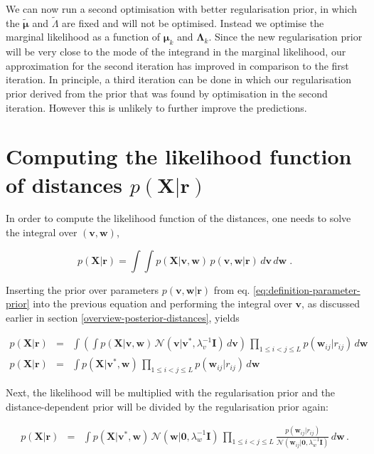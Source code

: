\documentclass[12pt,a4paper,twoside]{book}
\newcommand{\Gauss}{\mathcal{N}}
\newcommand{\I}{\mathbf{I}}
\newcommand{\Lk}{\mathbf{\Lambda}_k}
\newcommand{\muk}{\mathbf{\mu}_k}
\renewcommand{\r}{\mathbf{r}}
\newcommand{\rij}{r_{ij}}
\renewcommand{\v}{\mathbf{v}}
\newcommand{\w}{\mathbf{w}}
\newcommand{\wij}{\mathbf{w}_{ij}}
\newcommand{\X}{\mathbf{X}}
\theoremstyle{definition}
\theoremstyle{definition}
\theoremstyle{remark}
\begin{document}
We can now run a second optimisation with better regularisation prior,
in which the \(\tilde{\mathbf{\mu}}\) and \(\tilde{\Lambda}\) are fixed
and will not be optimised. Instead we optimise the marginal likelihood
as a function of \(\muk\) and \(\Lk\). Since the new regularisation
prior will be very close to the mode of the integrand in the marginal
likelihood, our approximation for the second iteration has improved in
comparison to the first iteration. In principle, a third iteration can
be done in which our regularisation prior derived from the prior that
was found by optimisation in the second iteration. However this is
unlikely to further improve the predictions.

\section{\texorpdfstring{Computing the likelihood function of distances
\(p(\X | \r)\)}{Computing the likelihood function of distances p(\textbackslash{}X \textbar{} \textbackslash{}r)}}\label{likelihood-fct-distances}

In order to compute the likelihood function of the distances, one needs
to solve the integral over \((\v, \w)\),

\begin{equation}
    p(\X | \r) = \int \int p(\X | \v,\w) \, p(\v, \w | \r) \,d\v\,d\w \; .
\label{eq:likelihood-distances}
\end{equation}

Inserting the prior over parameters \(p(\v, \w | \r)\) from eq.
\eqref{eq:definition-parameter-prior} into the previous equation and
performing the integral over \(\v\), as discussed earlier in section
\ref{overview-posterior-distances}, yields

\begin{eqnarray}
    p(\X | \r) &=& \int \left( \int  p(\X | \v,\w) \, \Gauss(\v|\v^*,\lambda_v^{-1} \I) \,d\v \right) \, \prod_{1\le i<j\le L} p(\wij|\rij) \, d\w  \\
    p(\X | \r) &=& \int  p(\X | \v^*,\w) \, \prod_{1\le i<j\le L} p(\wij|\rij) \, d\w  
\label{eq:in_over_w_1}
\end{eqnarray}

Next, the likelihood will be multiplied with the regularisation prior
and the distance-dependent prior will be divided by the regularisation
prior again:

\begin{eqnarray}
      p(\X | \r) &=& \int p(\X | \v^*,\w) \, \Gauss(\w|\mathbf{0}, \lambda_w^{-1} \I) \, \prod_{1\le i<j\le L} \frac{p(\wij|\rij)}{\Gauss(\wij|\mathbf{0}, \lambda_w^{-1} \I)} \,d\w \, .
\end{eqnarray}
\end{document}
